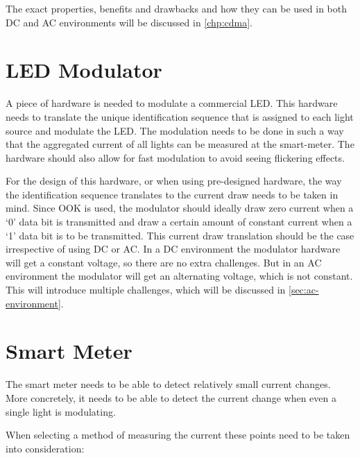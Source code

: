 	The exact properties, benefits and drawbacks and how they can be used in both DC and AC environments will be discussed in \autoref{chp:cdma}.




	\section{LED Modulator}

	A piece of hardware is needed to modulate a commercial LED.
	This hardware needs to translate the unique identification sequence that is assigned to each light source and modulate the LED.
	The modulation needs to be done in such a way that the aggregated current of all lights can be measured at the smart-meter.  
	The hardware should also allow for fast modulation to avoid seeing flickering effects.


	For the design of this hardware, or when using pre-designed hardware, the way the identification sequence translates to the current draw needs to be taken in mind.
	Since OOK is used, the modulator should ideally draw zero current when a `0' data bit is transmitted and draw a certain amount of constant current when a `1' data bit is to be transmitted.
	This current draw translation should be the case irrespective of using DC or AC.
	In a DC environment the modulator hardware will get a constant voltage, so there are no extra challenges.
	But in an AC environment the modulator will get an alternating voltage, which is not constant. 
	This will introduce multiple challenges, which will be discussed in \autoref{sec:ac-environment}.



	\section{Smart Meter}

	The smart meter needs to be able to detect relatively small current changes.
	More concretely, it needs to be able to detect the current change when even a single light is modulating.

	When selecting a method of measuring the current these points need to be taken into consideration:

